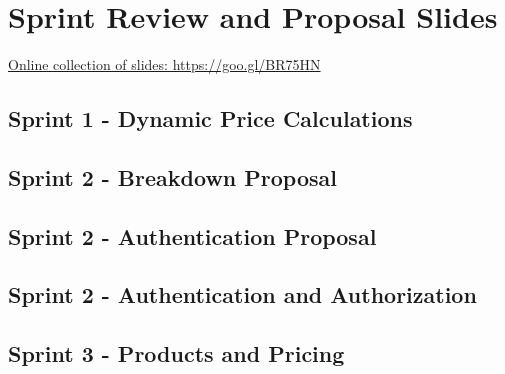 
\chapter{Sprint Review and Proposal Slides}
\label{appendix:slides}

\href{https://goo.gl/BR75HN}{Online collection of slides: https://goo.gl/BR75HN}

\section{Sprint 1 - Dynamic Price Calculations}
\label{appendix:slides_1}


\section{Sprint 2 - Breakdown Proposal}
\label{appendix:slides_2_breakdown}


\section{Sprint 2 - Authentication Proposal}
\label{appendix:slides_2_authentication}


\section{Sprint 2 - Authentication and Authorization}
\label{appendix:slides_2}


\section{Sprint 3 - Products and Pricing}
\label{appendix:slides_3}



